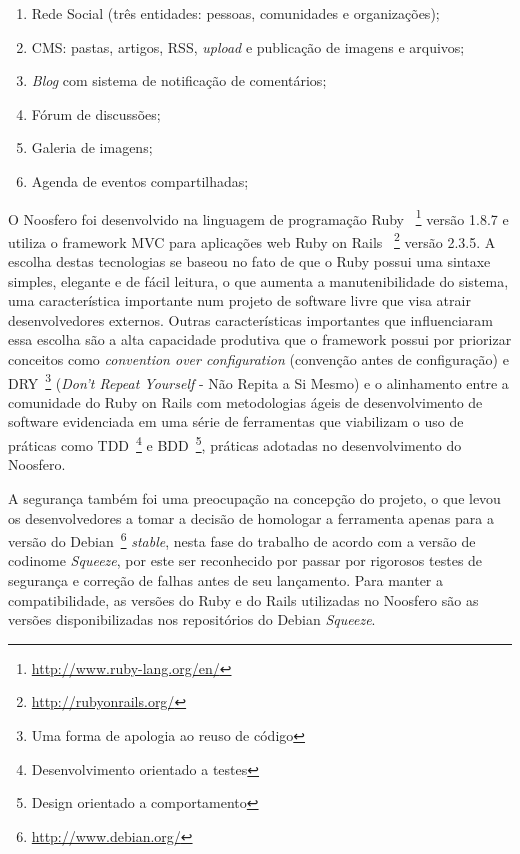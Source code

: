 \begin{enumerate}

\item \label{noosfero-social} Rede Social (três entidades: pessoas, comunidades
e organizações);
\item \label{noosfero-cms} CMS: pastas, artigos, RSS, \textit{upload} e
publicação de imagens e arquivos;
\item \label{noosfero-blog} \textit{Blog} com sistema de notificação de comentários;
\item \label{noosfero-forum} Fórum de discussões;
\item \label{noosfero-gallery} Galeria de imagens;
\item Agenda de eventos compartilhadas;

\end{enumerate}


O Noosfero foi desenvolvido na linguagem de programação Ruby
~\footnote{\url{http://www.ruby-lang.org/en/}}
versão 1.8.7 e utiliza o framework MVC para aplicações web Ruby on Rails
~\footnote{\url{http://rubyonrails.org/}}
versão 2.3.5.
%
A escolha destas tecnologias se baseou no fato de que o Ruby possui uma sintaxe
simples, elegante e de fácil leitura, o que aumenta a manutenibilidade do sistema,
uma característica importante num projeto de software livre que visa atrair
desenvolvedores externos. 
%
Outras características importantes que influenciaram essa escolha são a alta
capacidade produtiva que o framework possui por priorizar conceitos como
\textit{convention over configuration} (convenção antes de configuração)
e DRY~\footnote{Uma forma de apologia ao reuso de código}
(\textit{Don't Repeat Yourself} - Não Repita a Si Mesmo)
e o alinhamento entre a comunidade do Ruby on Rails com metodologias ágeis de
desenvolvimento de software evidenciada em uma série de ferramentas que
viabilizam o uso de práticas como TDD~\footnote{Desenvolvimento orientado a testes}
e BDD~\footnote{Design orientado a comportamento}, práticas adotadas no
desenvolvimento do Noosfero.


A segurança também foi uma preocupação na concepção do projeto, o que levou os
desenvolvedores a tomar a decisão de homologar a ferramenta apenas para a
versão do Debian~\footnote{\url{http://www.debian.org/}}
\textit{stable}, nesta fase do trabalho de acordo com a versão de codinome
\textit{Squeeze}, por este ser reconhecido por passar por rigorosos testes de
segurança e correção de falhas antes de seu lançamento. 
%
Para manter a compatibilidade, as versões do Ruby e do Rails utilizadas no
Noosfero são as versões disponibilizadas nos repositórios do Debian
\textit{Squeeze}.

